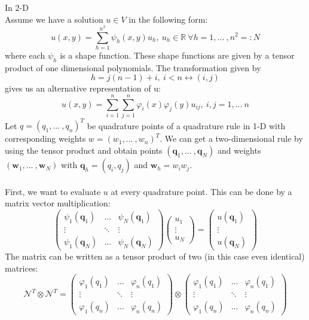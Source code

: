 \documentclass[a4paper,12pt]{report}
\begin{document}
In 2-D\\
Assume we have a solution $u \in V$ in the following form:
\begin{equation}
u(x,y)=\sum_{h=1}^{n^2} \psi_h (x,y) u_h,\ u_h \in \mathbb{R} \ \forall h =1,...\ ,n^2=:N
\end{equation}
where each $\psi_h$ is a shape function. These shape functions are given by a tensor product of one dimensional polynomials. The transformation given by 
\begin{equation}
h=j(n-1)+i,\ i<n \leftrightarrow (i,j)
\end{equation}
gives us an alternative representation of u:
\begin{equation}
u(x,y)=\sum_{i=1}^n \sum_{j=1}^n \varphi_i(x) \varphi_j(y) u_{ij}, \ i,j =1,...\ n
\end{equation}
Let $q=(q_1,...\ ,q_n)^T$ be quadrature points of a quadrature rule in 1-D with corresponding weights $w=(w_1,...\ ,w_n)^T$. We can get a two-dimensional rule by using the tensor product and obtain points $(\bm{q}_1,...\ ,\bm{q}_N)$ and weights $(\bm{w}_1,...\ ,\bm{w}_N)$ with $\bm{q}_h=(q_i,q_j)$ and $\bm{w}_h=w_i w_j$.\\ \\
First, we want to evaluate $u$ at every quadrature point. This can be done by a matrix vector multiplication:
\begin{equation}
\begin{pmatrix}
\psi_1(\bm{q}_1) & \hdots & \psi_N(\bm{q}_1) \\
\vdots & \ddots & \vdots \\
\psi_1(\bm{q}_N) & \hdots & \psi_N(\bm{q}_N)
\end{pmatrix}
\begin{pmatrix}
u_1 \\
\vdots \\
u_N
\end{pmatrix}
=
\begin{pmatrix}
u(\bm{q}_1) \\
\vdots \\
u(\bm{q}_N)
\end{pmatrix}
\end{equation}
The matrix can be written as a tensor product of two (in this case even identical) matrices:
\begin{equation}
\mathcal{N}^T \otimes \mathcal{N}^T =
\begin{pmatrix}
\varphi_1(q_1) & \hdots & \varphi_n(q_1) \\
\vdots & \ddots & \vdots \\
\varphi_1(q_n) & \hdots & \varphi_n(q_n)
\end{pmatrix}
\otimes
\begin{pmatrix}
\varphi_1(q_1) & \hdots & \varphi_n(q_1) \\
\vdots & \ddots & \vdots \\
\varphi_1(q_n) & \hdots & \varphi_n(q_n)
\end{pmatrix}
\end{equation}
\end{document}
